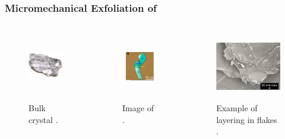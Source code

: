 \documentclass{beamer}
\begin{document}
\begin{frame}
\frametitle{Micromechanical Exfoliation of }
\begin{columns}
	\begin{column}{0.31\textwidth}
		\begin{figure}
			\centering
			\includegraphics[height=3cm,width=3cm]{../present_figs/bulkMoS2crystal}
			\caption{Bulk  crystal \cite{Wang2012}.}
		\end{figure}
	\end{column}
	\begin{column}{0.31\textwidth}
		\begin{figure}
			\centering
			\includegraphics[height=3cm, width=3cm]{../present_figs/exfoliation}
			\caption{Image of  \cite{Li2014}.}
		\end{figure}
	\end{column}
	\begin{column}{0.31\textwidth}
		\begin{figure}
			\centering
			\includegraphics[height=3cm, width=3cm]{../present_figs/exfoliatedMoS2}
			\caption{Example of layering in  flakes \cite{SingleLayer2011}.}
		\end{figure}
	\end{column}
\end{columns}
\end{frame}
\end{document}
